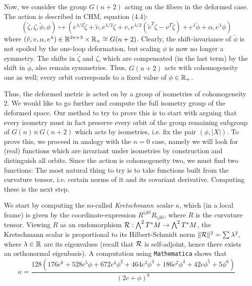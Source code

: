 \documentclass[parskip=half]{scrartcl}
\begin{document}
Now, we consider the group $G(n+2)$ acting on the fibers in the deformed case. The action is described in CHM, equation (4.4):
\begin{equation*}
	(\tilde\zeta,\zeta,\tilde\phi,\phi)\longmapsto
	(e^{\lambda/2}\tilde\zeta+\tilde v,e^{\lambda/2}\zeta+v,
	e^{\lambda/2}(\tilde v^T \zeta - v^T \tilde\zeta) +e^\lambda\tilde\phi +\alpha, e^\lambda \phi)
\end{equation*}
where $(\tilde v,v,\alpha,e^\lambda)\in \mathbb{R}^{2n+3}\times \mathbb{R}_+\cong G(n+2)$. Clearly, the shift-invariance of $\tilde\phi$ is not spoiled by the one-loop deformation, but scaling $\phi$ is now no longer a symmetry. The shifts in $\tilde\zeta$ and $\zeta$, which are compensated (in the last term) by the shift in $\tilde\phi$, also remain symmetries. Thus, $G(n+2)$ acts with cohomogeneity one as well; every orbit corresponds to a fixed value of $\phi\in \mathbb{R}_+$.

Thus, the deformed metric is acted on by a group of isometries of cohomogeneity 2. We would like to go further and compute the full isometry group of the deformed space. Our method to try to prove this is to start with arguing that every isometry must in fact preserve every orbit of the group remaining subgroup of $G(n)\ltimes G(n+2)$ which acts by isometries, i.e. fix the pair $(\phi,|X|)$. To prove this, we proceed in analogy with the $n=0$ case, namely we will look for (real) functions which are invariant under isometries by construction and distinguish all orbits. Since the action is cohomogeneity two, we must find two functions: The most natural thing to try is to take functions built from the curvature tensor, i.e. certain norms of it and its covariant derivative. Computing these is the next step.

We start by computing the so-called \emph{Kretschmann scalar} $\kappa$, which (in a local frame) is given by the coordinate-expression $R^{ijkl} R_{ijkl}$, where $R$ is the curvature tensor. Viewing $R$ as an endomorphism $\mathcal{R}:\bigwedge^2 T^*M\to \bigwedge^2 T^*M$, the Kretschmann scalar is proportional to its Hilbert-Schmidt norm $\lVert \mathcal{R} \rVert^2=\sum \lambda^2$, where $\lambda\in\mathbb{R}$ are its eigenvalues (recall that $\mathcal{R}$ is self-adjoint, hence there exists an orthonormal eigenbasis). A computation using \texttt{Mathematica} shows that
\begin{equation*}
	\kappa=\frac{128(176c^6 + 528c^5\phi + 672c^4\phi^2 + 464c^3\phi^3 + 186c^2\phi^4 + 42c\phi^5+5 \phi^6)}{(2 c+\phi)^6}
\end{equation*}
\end{document}
